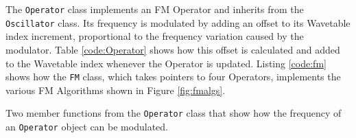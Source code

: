   The \texttt{Operator} class implements an FM Operator and inherits from the \texttt{Oscillator} class. Its frequency is modulated by adding an offset to its Wavetable index increment, proportional to the frequency variation caused by the modulator. Table \ref{code:Operator} shows how this offset is calculated and added to the Wavetable index whenever the Operator is updated. Listing \ref{code:fm} shows how the \texttt{FM} class, which takes pointers to four Operators, implements the various FM Algorithms shown in Figure \ref{fig:fmalgs}.

  \begin{table}[hb!]
    \caption{Two member functions from the \texttt{Operator} class that show how the frequency of an \texttt{Operator} object can be modulated.}
    \label{code:Operator}
  \end{table}
